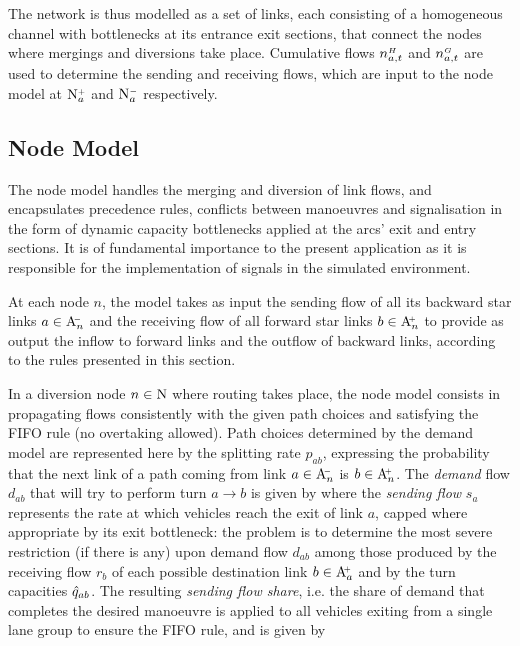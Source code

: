 The network is thus modelled as a set of links, each consisting of a homogeneous channel with bottlenecks at its entrance exit sections, that connect the nodes where mergings and diversions take place. Cumulative flows $n_{a,t}^{\scriptscriptstyle{H}}$ and $n_{a,t}^{\scriptscriptstyle{G}}$ are used to determine the sending and receiving flows, which are input to the node model at $\mathrm{N}_{a}^{\scriptscriptstyle{+}}$ and $\mathrm{N}_{a}^{\scriptscriptstyle{-}}$ respectively.


\subsection{Node Model} \label{s:nodemodel}
The node model handles the merging and diversion of link flows, and encapsulates precedence rules, conflicts between manoeuvres and signalisation in the form of dynamic capacity bottlenecks applied at the arcs' exit and entry sections. It is of fundamental importance to the present application as it is responsible for the implementation of signals in the simulated environment.

At each node $n$, the model takes as input the sending flow of all its backward star links $a \in \mathrm{A}_{n}^{\scriptscriptstyle{\hspace{-2pt}-}}$ and the receiving flow of all forward star links $b \in \mathrm{A}_{n}^{\scriptscriptstyle{\hspace{-2pt}+}}$ to provide as output the inflow to forward links and the outflow of backward links, according to the rules presented in this section.

In a diversion node $n \in \mathrm{N}$ where routing takes place, the node model consists in propagating flows consistently with the given path choices and satisfying the FIFO rule (no overtaking allowed). Path choices determined by the demand model are represented here by the splitting rate $p_{ab}$, expressing the probability that the next link of a path coming from link $a \in \mathrm{A}_{n}^{\scriptscriptstyle{\hspace{-2pt}-}}$ is $b \in \mathrm{A}_{n}^{\scriptscriptstyle{\hspace{-2pt}+}}$. The \emph{demand} flow $d_{ab}$ that will try to perform turn $a \rightarrow b$ is given by
where the \emph{sending flow} $s_a$ represents the rate at which vehicles reach the exit of link $a$, capped where appropriate by its exit bottleneck: the problem is to determine the most severe restriction (if there is any) upon demand flow $d_{ab}$ among those produced by the receiving flow $r_b$ of each possible destination link $b \in \mathrm{A}_{a}^{\scriptscriptstyle{\hspace{-2pt}+}}$ and by the turn capacities $\hat{q}_{ab}$. The resulting \emph{sending flow share}, i.e. the share of demand that completes the desired manoeuvre is applied to all vehicles exiting from a single lane group to ensure the FIFO rule, and is given by

